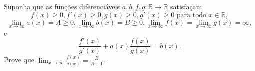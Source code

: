 Suponha que as funções diferenciáveis \(a, b, f, g\colon \mathbb{R} \to \mathbb{R} \) satisfaçam
\[ f(x)\geq 0, f'(x) \geq 0,g(x)\geq 0, g'(x) \geq 0 \text{ para todo } x \in \mathbb{R}, \]
\[ \lim_{x\rightarrow \infty} a(x)=A\geq 0,\lim_{x\rightarrow \infty} b(x)=B\geq 0, \lim_{x\rightarrow \infty} f(x)=\lim_{x\rightarrow \infty} g(x)=\infty, \]
e
\[ \frac{f'(x)}{g'(x)}+a(x)\frac{f(x)}{g(x)}=b(x). \]
Prove que \(\lim_{x\rightarrow\infty}\frac{f(x)}{g(x)}=\frac{B}{A+1}\).
